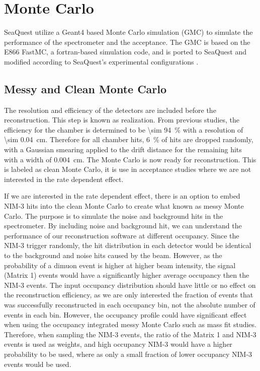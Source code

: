 \documentclass[../main.tex]{subfiles}
\begin{document}
\section{Monte Carlo}
\label{sec:MC}
SeaQuest utilize a Geant4 based Monte Carlo simulation (GMC) to simulate the
performance of the spectrometer and the acceptance. The GMC is based on the
E866 FastMC, a fortran-based simulation code, and is ported to SeaQuest and
modified according to SeaQuest’s experimental configurations \cite{kerns2018,prasad2020}.

\subsection{Messy and Clean Monte Carlo}
\label{subsec:messyMC}
The resolution and efficiency of the detectors are included before the reconstruction.
This step is known as realization.
From previous studies, the efficiency for the chamber is determined to be \SI{\sim 94}{\percent}
with a resolution of \SI{\sim 0.04}{\cm}. Therefore for all chamber hits, \SI{6}{\percent} of
hits are dropped randomly, with a Gaussian smearing applied to the drift distance for the remaining
hits with a width of \SI{0.004}{\cm}. The Monte Carlo is now ready for reconstruction. This is
labeled as clean Monte Carlo, it is use in acceptance studies where we are not interested in the
rate dependent effect.

If we are interested in the rate dependent effect, there is an option to embed NIM-3 hits into
the clean Monte Carlo to create what known as messy Monte Carlo.
The purpose is to simulate the noise and background hits in the spectrometer. By including noise 
and background hit, we can understand the performance of our reconstruction software at different
occupancy.
Since the NIM-3 trigger randomly, the hit distribution in each detector would be identical to
the background and noise hits caused by the beam. However, as the probability of a dimuon event
is higher at higher beam intensity, the signal (Matrix 1) events would have a significantly higher
average occupancy then the NIM-3 events. The input occupancy distribution should have little or no
effect on the reconstruction efficiency, as we are only interested the fraction of events that was
successfully reconstructed in each occupancy bin, not the absolute number of events in each bin.
However, the occupancy profile could have significant effect when using the occupancy integrated
messy Monte Carlo such as mass fit studies. Therefore, when sampling the NIM-3 events, the ratio
of the Matrix 1 and NIM-3 events is used as weights, and high occupancy NIM-3 would have a higher
probability to be used, where as only a small fraction of lower occupancy NIM-3 events would be used.
\end{document}
